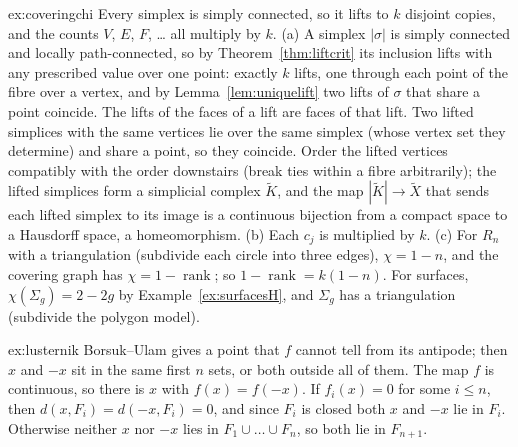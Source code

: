 \begin{solution}{ex:coveringchi}
\idea Every simplex is simply connected, so it lifts to $k$ disjoint copies, and the counts $V$, $E$, $F$, \dots{} all multiply by $k$.
\writeup (a) A simplex $|\sigma|$ is simply connected and locally path-connected, so by Theorem~\ref{thm:liftcrit} its inclusion lifts with any prescribed value over one point: exactly $k$ lifts, one through each
point of the fibre over a vertex, and by Lemma~\ref{lem:uniquelift} two lifts of $\sigma$ that share a point coincide. The lifts of the faces of a lift are faces of that lift. Two lifted simplices with the same
vertices lie over the same simplex (whose vertex set they determine) and share a point, so they coincide. Order the lifted vertices compatibly with the order downstairs (break ties within a fibre
arbitrarily); the lifted simplices form a simplicial complex $\tilde K$, and the map $|\tilde K|\to\tilde X$ that sends each lifted simplex to its image is a continuous bijection from a compact space to a Hausdorff space,
a homeomorphism. (b) Each $c_j$ is multiplied by $k$. (c) For $R_n$ with a triangulation (subdivide each circle into three edges), $\chi=1-n$, and the covering graph has $\chi=1-\operatorname{rank}$; so
$1-\operatorname{rank}=k(1-n)$. For surfaces, $\chi(\Sigma_g)=2-2g$ by Example~\ref{ex:surfacesH}, and $\Sigma_g$ has a triangulation (subdivide the polygon model).
\end{solution}

\begin{solution}{ex:lusternik}
\idea Borsuk--Ulam gives a point that $f$ cannot tell from its antipode; then $x$ and $-x$ sit in the same first $n$ sets, or both outside all of them.
\writeup The map $f$ is continuous, so there is $x$ with $f(x)=f(-x)$. If $f_i(x)=0$ for some $i\le n$, then $d(x,F_i)=d(-x,F_i)=0$, and since $F_i$ is closed both $x$ and $-x$ lie in $F_i$. Otherwise neither $x$ nor $-x$
lies in $F_1\cup\dots\cup F_n$, so both lie in $F_{n+1}$.
\end{solution}

